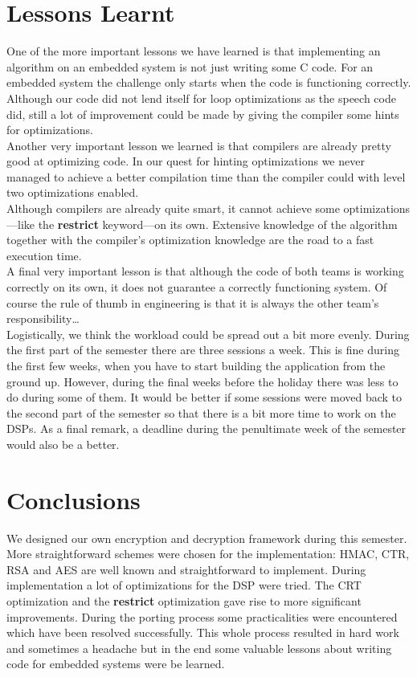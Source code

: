 \documentclass[a4paper]{article}
\begin{document}
\section{Lessons Learnt}

One of the more important lessons we have learned is that implementing an algorithm on an embedded system is not just writing some C code. For an embedded system the challenge only starts when the code is functioning correctly. Although our code did not lend itself for loop optimizations as the speech code did, still a lot of improvement could be made by giving the compiler some hints for optimizations.\\

Another very important lesson we learned is that compilers are already pretty good at optimizing code. In our quest for hinting optimizations we never managed to achieve a better compilation time than the compiler could with level two optimizations enabled.\\

Although compilers are already quite smart, it cannot achieve some optimizations---like the \textbf{restrict} keyword---on its own. Extensive knowledge of the algorithm together with the compiler's optimization knowledge are the road to a fast execution time.\\

A final very important lesson is that although the code of both teams is working correctly on its own, it does not guarantee a correctly functioning system. Of course the rule of thumb in engineering is that it is always the other team's responsibility\ldots\\

Logistically, we think the workload could be spread out a bit more evenly. During the first part of the semester there are three sessions a week. This is fine during the first few weeks, when you have to start building the application from the ground up. However, during the final weeks before the holiday there was less to do during some of them. It would be better if some sessions were moved back to the second part of the semester so that there is a bit more time to work on the DSPs. As a final remark, a deadline during the penultimate week of the semester would also be a better.

\section{Conclusions}

We designed our own encryption and decryption framework during this semester. More straightforward schemes were chosen for the implementation: HMAC, CTR, RSA and AES are well known and straightforward to implement. During implementation a lot of optimizations for the DSP were tried. The CRT optimization and the \textbf{restrict} optimization gave rise to more significant improvements. During the porting process some practicalities were encountered which have been resolved successfully. This whole process resulted in hard work and sometimes a headache but in the end some valuable lessons about writing code for embedded systems were be learned.
\end{document}

